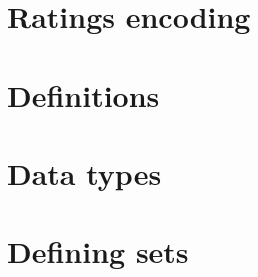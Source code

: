 
\section*{Ratings encoding}

\vfill
\section*{Definitions}

\vfill
\section*{Data types}

\vfill
\section*{Defining sets}

\vfill
